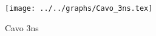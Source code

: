 \begin{figure}[h] \centering\texttt{[image: ../../graphs/Cavo\_3ns.tex]}\caption{Cavo 3ns}\label{gr:Cavo_3ns} \end{figure}
